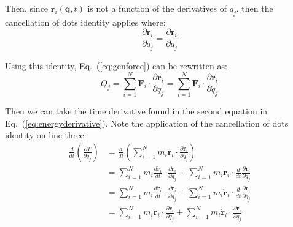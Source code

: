 \documentclass[titlepage]{article}
\begin{document}
Then, since $\boldsymbol{r}_i(\boldsymbol{q},t)$ is not a function of the derivatives of $q_j$, then the cancellation of dots identity applies where:
\begin{equation}
	\frac{\partial\dot{\boldsymbol{r}}_i}{\partial\dot{q}_j}=\frac{\partial\boldsymbol{r}_i}{\partial q_j}
\end{equation}

Using this identity, Eq.~(\ref{eq:genforce}) can be rewritten as:
\begin{equation}
	Q_j=\sum_{i=1}^{N}\boldsymbol{F}_i\cdot\frac{\partial\boldsymbol{r}_i}{\partial q_j}=\sum_{i=1}^{N}\boldsymbol{F}_i\cdot\frac{\partial\dot{\boldsymbol{r}}_i}{\partial\dot{q}_j}
	\label{eq:genforcedot}
\end{equation}

Then we can take the time derivative found in the second equation in Eq.~(\ref{eq:energyderivative}). Note the application of the cancellation of dots identity on line three:
\begin{equation}
	\begin{split}
		\frac{d}{dt}\left(\frac{\partial T}{\partial\dot{q}_j}\right)&=\frac{d}{dt}\left(\sum_{i=1}^{N}m_i\dot{\boldsymbol{r}}_i\cdot\frac{\partial\dot{\boldsymbol{r}}_i}{\partial\dot{q}_j}\right) \\
		&=\sum_{i=1}^{N}m_i\frac{d\dot{\boldsymbol{r}}_i}{dt}\cdot\frac{\partial\dot{\boldsymbol{r}}_i}{\partial\dot{q}_j}+\sum_{i=1}^{N}m_i\dot{\boldsymbol{r}}_i\cdot\frac{d}{dt}\frac{\partial\dot{\boldsymbol{r}}_i}{\partial\dot{q}_j} \\
		&=\sum_{i=1}^{N}m_i\frac{d\dot{\boldsymbol{r}}_i}{dt}\cdot\frac{\partial\dot{\boldsymbol{r}}_i}{\partial\dot{q}_j}+\sum_{i=1}^{N}m_i\dot{\boldsymbol{r}}_i\cdot\frac{d}{dt}\frac{\partial\boldsymbol{r}_i}{\partial q_j} \\
		&=\sum_{i=1}^{N}m_i\ddot{\boldsymbol{r}}_i\cdot\frac{\partial\dot{\boldsymbol{r}}_i}{\partial\dot{q}_j}+\sum_{i=1}^{N}m_i\dot{\boldsymbol{r}}_i\cdot\frac{\partial\dot{\boldsymbol{r}}_i}{\partial q_j}
	\end{split}
	\label{eq:lagrangepart1}
\end{equation}
\end{document}
